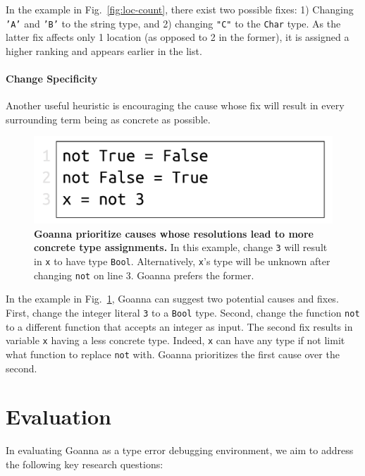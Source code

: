\documentclass[pdflatex,lineno,sn-nature,Numbered]{sn-jnl}%
\begin{document}
    In the example in Fig.~\ref{fig:loc-count}, there exist two possible fixes: 1) Changing \texttt{'A'} and \texttt{'B'} to the string type, and 2) changing \texttt{"C"} to the \texttt{Char} type. As the latter fix affects only 1 location (as opposed to 2 in the former), it is assigned a higher ranking and appears earlier in the list.

    \paragraph{Change Specificity}
	Another useful heuristic is encouraging the cause whose fix will result in every surrounding term being as concrete as possible.
	
	
   \begin{figure}[ht!]
        \centering
        \includegraphics[width=0.5\linewidth]{images/Specificity}
        \caption[Goanna prioritize causes whose resolutions lead to more concrete type assignments]{\textbf{Goanna prioritize causes whose resolutions lead to more concrete type assignments.} In this example, change \texttt{3} will result in \texttt{x} to have type \texttt{Bool}. Alternatively, \texttt{x}'s type will be unknown after changing \texttt{not} on line 3. Goanna prefers the former.} 
        \label{fig:specificity}
    \end{figure}

    In the example in Fig.~\ref{fig:specificity}, Goanna can suggest two potential causes and fixes. First, change the integer literal \texttt{3} to a \texttt{Bool} type. Second, change the function \texttt{not} to a different function that accepts an integer as input. The second fix results in variable \texttt{x} having a less concrete type. Indeed, \texttt{x} can have any type if not limit what function to replace \texttt{not} with. Goanna prioritizes the first cause over the second. 

    
       
\section{Evaluation} \label{sec:evaluation}

In evaluating Goanna as a type error debugging environment, we aim to address the following key research questions:
\end{document}
